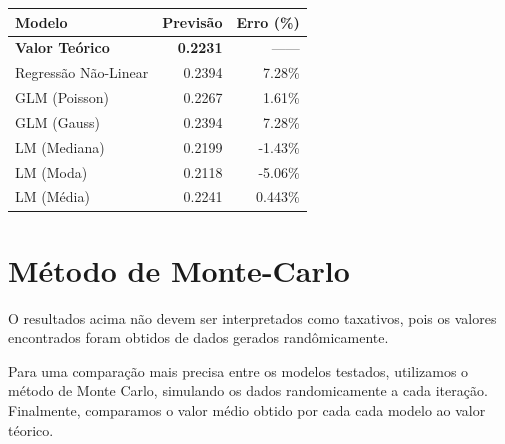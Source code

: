 \documentclass[a4paper]{article}
\begin{document}
\begin{longtable}[]{@{}lrr@{}}
\toprule
Modelo & Previsão & Erro (\%)\tabularnewline
\midrule
\endhead
\textbf{Valor Teórico} & \textbf{0.2231} & ------\tabularnewline
Regressão Não-Linear & 0.2394 & 7.28\%\tabularnewline
GLM (Poisson) & 0.2267 & 1.61\%\tabularnewline
GLM (Gauss) & 0.2394 & 7.28\%\tabularnewline
LM (Mediana) & 0.2199 & -1.43\%\tabularnewline
LM (Moda) & 0.2118 & -5.06\%\tabularnewline
LM (Média) & 0.2241 & 0.443\%\tabularnewline
\bottomrule
\end{longtable}

\section{Método de Monte-Carlo}\label{metodo-de-monte-carlo}

O resultados acima não devem ser interpretados como taxativos, pois os
valores encontrados foram obtidos de dados gerados randômicamente.

Para uma comparação mais precisa entre os modelos testados, utilizamos o
método de Monte Carlo, simulando os dados randomicamente a cada
iteração. Finalmente, comparamos o valor médio obtido por cada cada
modelo ao valor téorico.
\end{document}
